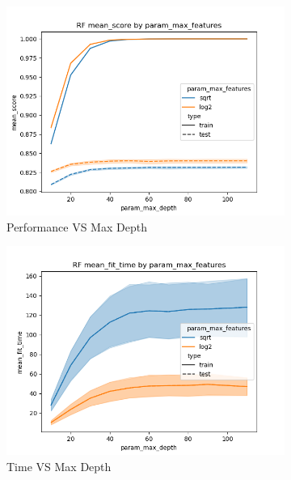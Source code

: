 \documentclass[12pt]{article}
\begin{document}
\begin{figure}
  \begin{subfigure}{.5\textwidth}
  \includegraphics[width=.95\textwidth]{../results/rf/param_max_features_mean_score_param_max_depth.png}
    \caption{Performance VS Max Depth}
    \end{subfigure}%
  \begin{subfigure}{.5\textwidth}
    \includegraphics[width=.95\textwidth]{../results/rf/param_max_features_mean_fit_time_param_max_depth.png}
    \caption{Time VS Max Depth}
  \end{subfigure}
  \begin{subfigure}{.5\textwidth}

\end{subfigure}
\end{figure}
\end{document}
